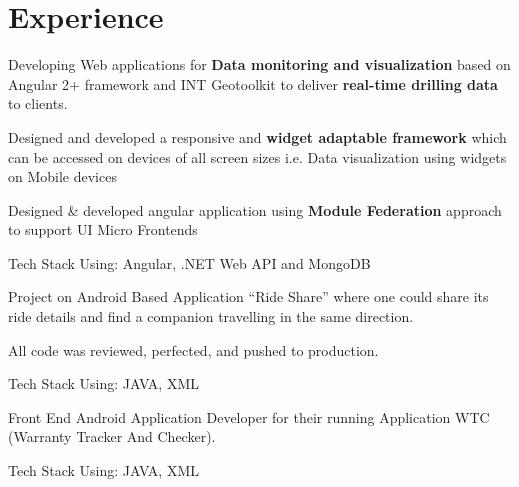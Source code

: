 \documentclass[a4paper]{deedy-resume-openfont}
\begin{document}
\begin{minipage}[t]{0.66\textwidth} 


\section{Experience}

\vspace{\topsep} %
\begin{tightemize}
 \item Developing Web applications for \textbf{Data monitoring and visualization} based on Angular 2+ framework and INT Geotoolkit to deliver \textbf{real-time drilling data} to clients.
 \item Designed and developed a responsive and \textbf{widget adaptable framework} which can be accessed on devices of all screen sizes i.e. Data visualization using widgets on Mobile devices
 \item Designed \& developed angular application using \textbf{Module Federation} approach to support UI Micro Frontends
 \item Tech Stack Using: Angular, .NET Web API and MongoDB
\end{tightemize}
\sectionsep


\begin{tightemize}
 \item Project on Android Based Application “Ride Share” where one could share its ride details and find a companion travelling in the same direction.
 \item All code was reviewed, perfected, and pushed to production.
 \item Tech Stack Using: JAVA, XML
\end{tightemize}
\sectionsep


\begin{tightemize}
 \item Front End Android Application Developer for their running Application WTC (Warranty Tracker And Checker).
 \item Tech Stack Using: JAVA, XML
\end{tightemize}
\sectionsep



\end{minipage}
\end{document}
